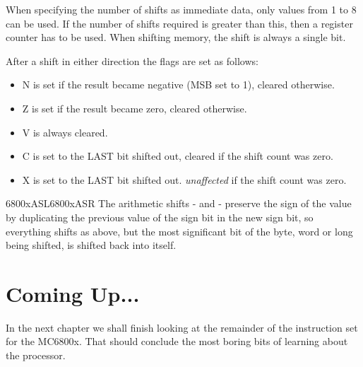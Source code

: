 When specifying the number of shifts as immediate data, only values
    from 1 to 8 can be used. If the number of shifts required is greater than
    this, then a register counter has to be used. When shifting memory, the
    shift is always a single bit.

After a shift in either direction the flags are set as follows:

\begin{itemize}[itemsep=0pt]

\item{}N is set if the result became negative (MSB set to 1), cleared
        otherwise.


\item{}Z is set if the result became zero, cleared otherwise.


\item{}V is always cleared.


\item{}C is set to the LAST bit shifted out, cleared if the shift count
        was zero.


\item{}X is set to the LAST bit shifted out. \emph{unaffected} if the shift
        count was zero.

\end{itemize}
\mc6800x{ASL}\mc6800x{ASR}
The arithmetic shifts -{}  and  -{} preserve the sign of the value by duplicating the previous value of the sign bit in the new sign bit, so
    everything shifts as above, but the most significant bit of the byte, word
    or long being shifted, is shifted back into itself.

\section{Coming Up...}
\label{ch4-the-end}%

In the next chapter we shall finish looking at the remainder of the
    instruction set for the MC6800x. That should conclude the most boring
    bits of learning about the processor.
